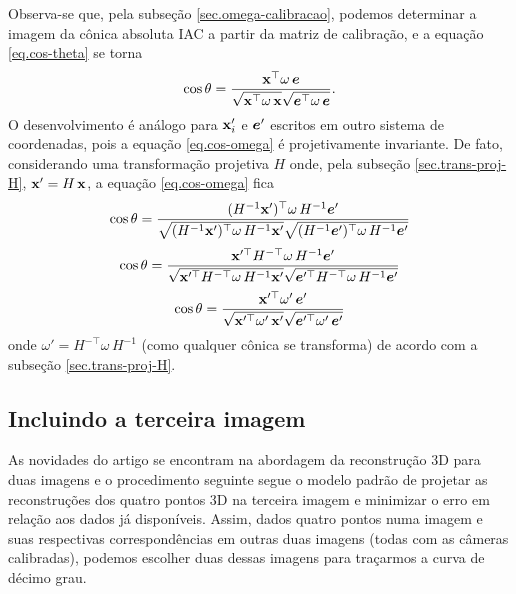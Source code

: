 Observa-se que, pela subseção \ref{sec.omega-calibracao}, podemos determinar a imagem da cônica absoluta IAC a partir da matriz de calibração, e a equação \ref{eq.cos-theta} se torna
\begin{equation}\label{eq.cos-omega}
\cos\theta=\frac{\mathbf{x}^\top\omega\,\boldsymbol{e}}{\sqrt{\mathbf{x}^\top\omega\,\mathbf{x}}\sqrt{\boldsymbol{e}^\top\omega\,\boldsymbol{e}}}.
\end{equation} 
O desenvolvimento é análogo para $\mathbf{x}'_i$ e $\boldsymbol{e}'$ escritos em outro sistema de coordenadas, pois a equação \ref{eq.cos-omega} é projetivamente invariante. De fato, considerando uma transformação projetiva $H$ onde, pela subseção \ref{sec.trans-proj-H},  $\mathbf{x}'=H\,\mathbf{x}$, a equação \ref{eq.cos-omega} fica
\begin{equation*}
\cos\theta=\frac{(H^{-1}\mathbf{x}')^\top\omega\,H^{-1}\boldsymbol{e}'}{\sqrt{(H^{-1}\mathbf{x}')^\top\omega\,H^{-1}\mathbf{x}'}\sqrt{(H^{-1}\boldsymbol{e}')^\top\omega\,H^{-1}\boldsymbol{e}'}}
\end{equation*} 
\begin{equation*}
\cos\theta=\frac{\mathbf{x}'^\top H^{-\top}\omega\,H^{-1}\boldsymbol{e}'}{\sqrt{\mathbf{x}'^\top H^{-\top}\omega\,H^{-1}\mathbf{x}'}\sqrt{\boldsymbol{e}'^\top H^{-\top}\omega\,H^{-1}\boldsymbol{e}'}}
\end{equation*}
\begin{equation*}
\cos\theta=\frac{\mathbf{x}'^\top \omega'\,\boldsymbol{e}'}{\sqrt{\mathbf{x}'^\top \omega'\,\mathbf{x}'}\sqrt{\boldsymbol{e}'^\top \omega'\,\boldsymbol{e}'}}
\end{equation*}
onde $\omega'=H^{-\top}\omega\,H^{-1}$ (como qualquer cônica se transforma) de acordo com a subseção \ref{sec.trans-proj-H}.

\subsection{Incluindo a terceira imagem}

As novidades do artigo se encontram na abordagem da reconstrução 3D para duas imagens e o procedimento seguinte segue o modelo padrão de projetar as reconstruções dos quatro pontos 3D na terceira imagem e minimizar o erro em relação aos dados já disponíveis. Assim, dados quatro pontos numa imagem e suas respectivas correspondências em outras duas imagens (todas com as câmeras calibradas), podemos escolher duas dessas imagens para traçarmos a curva de décimo grau. 

